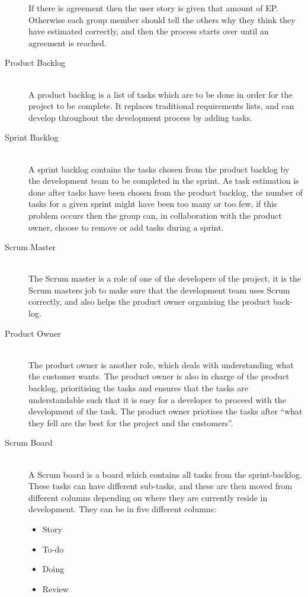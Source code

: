 \begin{description}
	If there is agreement then the user story is given that amount of EP.
	Otherwise each group member should tell the others why they think they have estimated correctly, and then the process starts over until an agreement is reached.
	\item[Product Backlog] \hfill \\
	A product backlog is a list of tasks which are to be done in order for the project to be complete. 
	It replaces traditional requirements lists, and can develop throughout the development process by adding tasks.
	\item[Sprint Backlog] \hfill \\
	A sprint backlog contains the tasks chosen from the product backlog by the development team to be completed in the sprint.
	As task estimation is done after tasks have been chosen from the product backlog, the number of tasks for a given sprint might have been too many or too few, if this problem occurs then the group can, in collaboration with the product owner, choose to remove or add tasks during a sprint. 
	\item[Scrum Master] \hfill \\
	The Scrum master is a role of one of the developers of the project, it is the Scrum masters job to make sure that the development team uses Scrum correctly, and also helps the product owner organising the product back-log.
	\item[Product Owner] \hfill \\
	The product owner is another role, which deals with understanding what the customer wants.
	The product owner is also in charge of the product backlog, prioritising the tasks and ensures that the tasks are understandable such that it is easy for a developer to proceed with the development of the task.
	The product owner priotises the tasks after ``what they fell are the best for the project and the customers''. 
	\item[Scrum Board] \hfill \\
	A Scrum board is a board which contains all tasks from the sprint-backlog.
	These tasks can have different sub-tasks, and these are then moved from different columns depending on where they are currently reside in development.
	They can be in five different columns:
	\begin{itemize}
		\item Story
		\item To-do
		\item Doing
		\item Review

\end{itemize}
\end{description}
